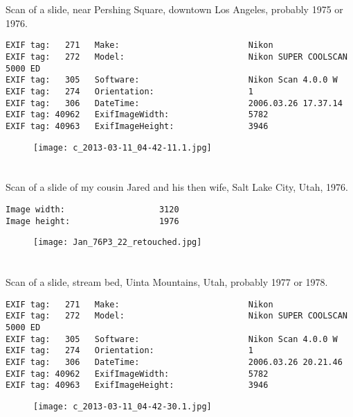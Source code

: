 \section{\protect{}}
\noindent Scan of a slide, near Pershing Square, downtown Los Angeles, probably 1975 or 1976.
\noindent
\begin{lstlisting}
EXIF tag:   271   Make:                          Nikon
EXIF tag:   272   Model:                         Nikon SUPER COOLSCAN 5000 ED
EXIF tag:   305   Software:                      Nikon Scan 4.0.0 W
EXIF tag:   274   Orientation:                   1
EXIF tag:   306   DateTime:                      2006.03.26 17.37.14
EXIF tag: 40962   ExifImageWidth:                5782
EXIF tag: 40963   ExifImageHeight:               3946

\end{lstlisting}
\clearpage
\begin{figure}
\raggedleft
\texttt{[image: c\_2013-03-11\_04-42-11.1.jpg]}
\end{figure}


\clearpage
\section{\protect{}}
\noindent Scan of a slide of my cousin Jared and his then wife, Salt Lake City, Utah, 1976.
\noindent
\begin{lstlisting}
Image width:                   3120
Image height:                  1976

\end{lstlisting}
\clearpage
\begin{figure}
\raggedleft
\texttt{[image: Jan\_76P3\_22\_retouched.jpg]}
\end{figure}


\clearpage
\section{\protect{}}
\noindent Scan of a slide, stream bed, Uinta Mountains, Utah, probably 1977 or 1978.
\noindent
\begin{lstlisting}
EXIF tag:   271   Make:                          Nikon
EXIF tag:   272   Model:                         Nikon SUPER COOLSCAN 5000 ED
EXIF tag:   305   Software:                      Nikon Scan 4.0.0 W
EXIF tag:   274   Orientation:                   1
EXIF tag:   306   DateTime:                      2006.03.26 20.21.46
EXIF tag: 40962   ExifImageWidth:                5782
EXIF tag: 40963   ExifImageHeight:               3946

\end{lstlisting}
\clearpage
\begin{figure}
\raggedleft
\texttt{[image: c\_2013-03-11\_04-42-30.1.jpg]}
\end{figure}


